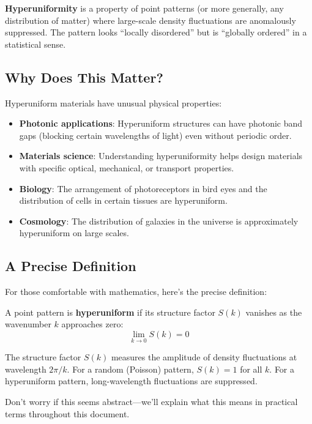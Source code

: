\documentclass[11pt,letterpaper]{article}
\begin{document}
\textbf{Hyperuniformity} is a property of point patterns (or more generally, any distribution of matter) where large-scale density fluctuations are anomalously suppressed. The pattern looks ``locally disordered'' but is ``globally ordered'' in a statistical sense.

\subsection{Why Does This Matter?}

Hyperuniform materials have unusual physical properties:

\begin{itemize}
    \item \textbf{Photonic applications}: Hyperuniform structures can have photonic band gaps (blocking certain wavelengths of light) even without periodic order.

    \item \textbf{Materials science}: Understanding hyperuniformity helps design materials with specific optical, mechanical, or transport properties.

    \item \textbf{Biology}: The arrangement of photoreceptors in bird eyes and the distribution of cells in certain tissues are hyperuniform.

    \item \textbf{Cosmology}: The distribution of galaxies in the universe is approximately hyperuniform on large scales.
\end{itemize}

\subsection{A Precise Definition}

For those comfortable with mathematics, here's the precise definition:

A point pattern is \textbf{hyperuniform} if its structure factor $S(k)$ vanishes as the wavenumber $k$ approaches zero:
\[
\lim_{k \to 0} S(k) = 0
\]

The structure factor $S(k)$ measures the amplitude of density fluctuations at wavelength $2\pi/k$. For a random (Poisson) pattern, $S(k) = 1$ for all $k$. For a hyperuniform pattern, long-wavelength fluctuations are suppressed.

Don't worry if this seems abstract---we'll explain what this means in practical terms throughout this document.
\end{document}

